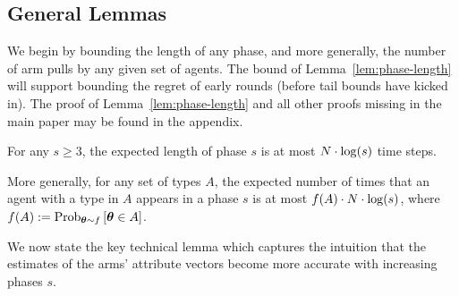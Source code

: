 \subsection{General Lemmas}





We begin by bounding the length of any phase,
and more generally, the number of arm pulls by any given set
  of agents.
The bound of Lemma~\ref{lem:phase-length} will support bounding the
regret of early rounds (before tail bounds have kicked in).
The proof of Lemma~\ref{lem:phase-length} and all other proofs missing
in the main paper may be found in the appendix.
  
\begin{lemma} \label{lem:phase-length}
For any $s\geq 3$, the expected length of phase $s$ is at most
$N \cdot \log(s)$ time steps.

More generally, for any set of types $A$, the expected number of times that 
an agent with a type in $A$ appears in a phase $s$ is at most 
$f(A) \cdot N \cdot \log(s)$,
where $f(A) := \Prob[\AgV \sim \AgentDist]{\AgV \in A}$.
\end{lemma}

                  
We now state the key technical lemma which captures the intuition that
the estimates of the arms' attribute vectors become
more accurate with increasing phases $s$.

